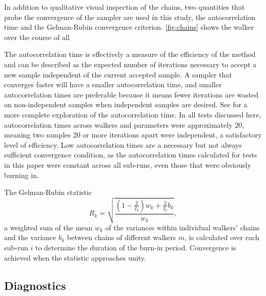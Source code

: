 \documentclass[preprint]{aastex}
\begin{document}
In addition to qualitative visual inspection of the chains, two quantities that 
probe the convergence of the sampler are used in this study, the 
autocorrelation time and the Gelman-Rubin convergence criterion.  %
\ref{fig:chains} shows the %
walker over the course of all %


The autocorrelation time is effectively a measure of the efficiency of the 
method and can be described as the expected number of iterations necessary to 
accept a new sample independent of the current accepted sample.  A sampler that 
converges faster will have a smaller autocorrelation time, and smaller 
autocorrelation times are preferable because it means fewer iterations are 
wasted on non-independent samples when independent samples are desired.  See 
\citet{Foreman-Mackey2013} for a more complete exploration of the 
autocorrelation time.  In all tests discussed here, autocorrelation times 
across walkers and parameters were approximately 20, meaning two samples 20 or 
more iterations apart were independent, a satisfactory level of efficiency.  
Low autocorrelation times are a necessary but not always sufficient convergence 
condition, as the autocorrelation times calculated for tests in this paper were 
constant across all sub-runs, even those that were obviously burning in.  

The Gelman-Rubin statistic
\begin{equation}
\label{eq:gr}
R_{k} = \sqrt{\frac{(1-\frac{2}{I_{0}})w_{k}+\frac{2}{I_{0}}b_{k}}{w_{k}}},
\end{equation}
a weighted sum of the mean $w_{k}$ of the variances within individual walkers' 
chains and the variance $b_{k}$ between chains of different walkers $m$, is 
calculated over each sub-run $i$ to determine the duration of the burn-in 
period.  Convergence is achieved when the statistic approaches unity.  

\subsection{Diagnostics}
\label{sec:diag}
\end{document}

